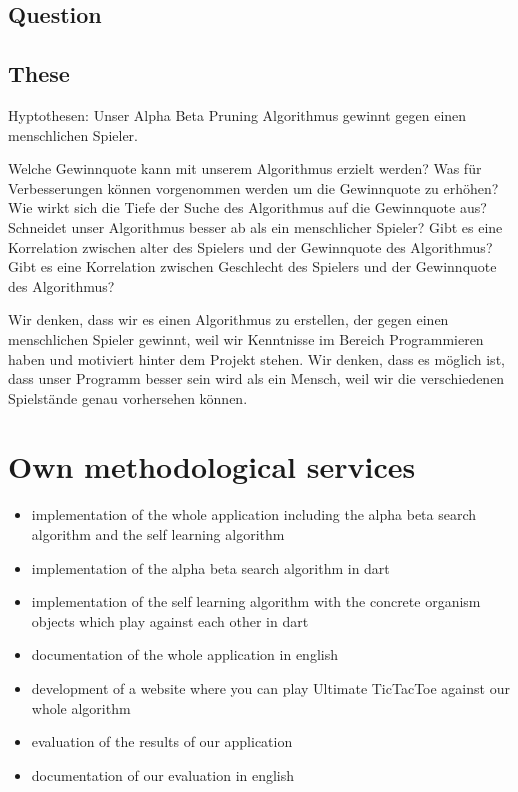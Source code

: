 \subsection{Question} %

\subsection{These}
Hyptothesen:
Unser Alpha Beta Pruning Algorithmus gewinnt gegen einen menschlichen Spieler.

Welche Gewinnquote kann mit unserem Algorithmus erzielt werden?
Was für Verbesserungen können vorgenommen werden um die Gewinnquote zu erhöhen?
Wie wirkt sich die Tiefe der Suche des Algorithmus auf die Gewinnquote aus?
Schneidet unser Algorithmus besser ab als ein menschlicher Spieler?
Gibt es eine Korrelation zwischen alter des Spielers und der Gewinnquote des Algorithmus?
Gibt es eine Korrelation zwischen Geschlecht des Spielers und der Gewinnquote des Algorithmus?

Wir denken, dass wir es  einen Algorithmus zu erstellen, der gegen einen menschlichen Spieler gewinnt, weil wir Kenntnisse im Bereich Programmieren haben und motiviert hinter dem Projekt stehen.
Wir denken, dass es möglich ist, dass unser Programm besser sein wird als ein Mensch, weil wir die verschiedenen Spielstände genau vorhersehen können.


\section{Own methodological services}
\begin{itemize}
    \item implementation of the whole application including the alpha beta search algorithm and the self learning algorithm
    \item implementation of the alpha beta search algorithm in dart
    \item implementation of the self learning algorithm with the concrete organism objects which play against each other in dart
    \item documentation of the whole application in english
    \item development of a website where you can play Ultimate TicTacToe against our whole algorithm
    \item evaluation of the results of our application
    \item documentation of our evaluation in english
\end{itemize}


